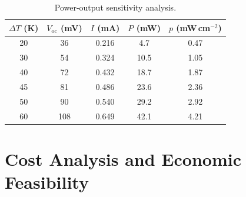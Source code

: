 \documentclass[11pt,a4paper]{article}
\begin{document}
\begin{table}[htbp]
\centering
\caption{Power-output sensitivity analysis.}
\label{tab:power_sensitivity}
\small
\begin{tabular}{@{}ccccc@{}}
\toprule
\rowcolor{lightblue}
\textbf{$\Delta T$ (K)} & \textbf{$V_{\mathrm{oc}}$ (mV)} & \textbf{$I$ (mA)} & \textbf{$P$ (mW)} & \textbf{$p$ (mW\,cm$^{-2}$)} \\
\midrule
20 & 36  & 0.216 & 4.7  & 0.47 \\
30 & 54  & 0.324 & 10.5 & 1.05 \\
40 & 72  & 0.432 & 18.7 & 1.87 \\
\rowcolor{lightyellow}
45 & 81  & 0.486 & 23.6 & 2.36 \\
50 & 90  & 0.540 & 29.2 & 2.92 \\
60 & 108 & 0.649 & 42.1 & 4.21 \\
\bottomrule
\end{tabular}
\end{table}

\section{Cost Analysis and Economic Feasibility}
\end{document}
